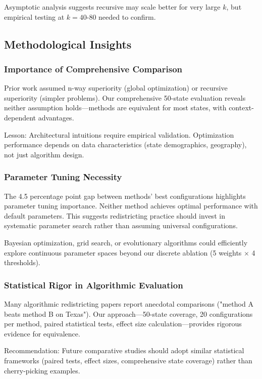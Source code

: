 Asymptotic analysis suggests recursive may scale better for very large $k$, but empirical testing at $k=40$-$80$ needed to confirm.

\subsection{Methodological Insights}

\subsubsection{Importance of Comprehensive Comparison}

Prior work assumed n-way superiority (global optimization) or recursive superiority (simpler problems). Our comprehensive 50-state evaluation reveals neither assumption holds—methods are equivalent for most states, with context-dependent advantages.

Lesson: Architectural intuitions require empirical validation. Optimization performance depends on data characteristics (state demographics, geography), not just algorithm design.

\subsubsection{Parameter Tuning Necessity}

The 4.5 percentage point gap between methods' best configurations highlights parameter tuning importance. Neither method achieves optimal performance with default parameters. This suggests redistricting practice should invest in systematic parameter search rather than assuming universal configurations.

Bayesian optimization, grid search, or evolutionary algorithms could efficiently explore continuous parameter spaces beyond our discrete ablation (5 weights $\times$ 4 thresholds).

\subsubsection{Statistical Rigor in Algorithmic Evaluation}

Many algorithmic redistricting papers report anecdotal comparisons ("method A beats method B on Texas"). Our approach—50-state coverage, 20 configurations per method, paired statistical tests, effect size calculation—provides rigorous evidence for equivalence.

Recommendation: Future comparative studies should adopt similar statistical frameworks (paired tests, effect sizes, comprehensive state coverage) rather than cherry-picking examples.

